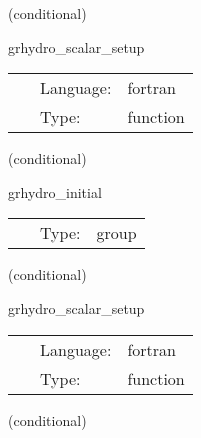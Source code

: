 \vspace{5mm}

   (conditional) 

\hspace{5mm} grhydro\_scalar\_setup 

\hspace{5mm}{\it set up and check scalars for efficiency } 


\hspace{5mm}

 \begin{tabular*}{160mm}{cll} 
~ & Language:  & fortran \\ 
~ & Type:  & function \\ 
\end{tabular*} 


\vspace{5mm}

   (conditional) 

\hspace{5mm} grhydro\_initial 

\hspace{5mm}{\it grhydro initial data group } 


\hspace{5mm}

 \begin{tabular*}{160mm}{cll} 
~ & Type:  & group \\ 
\end{tabular*} 


\vspace{5mm}

   (conditional) 

\hspace{5mm} grhydro\_scalar\_setup 

\hspace{5mm}{\it set up and check scalars for efficiency } 


\hspace{5mm}

 \begin{tabular*}{160mm}{cll} 
~ & Language:  & fortran \\ 
~ & Type:  & function \\ 
\end{tabular*} 


\vspace{5mm}

   (conditional) 

